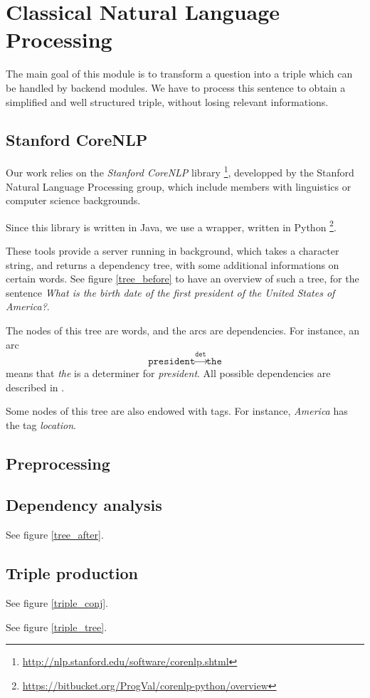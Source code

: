 \chapter{Classical Natural Language Processing}

The main goal of this module is to transform a question into a triple which can
be handled by backend modules. We have to process this sentence to obtain a simplified
and well structured triple, without losing relevant informations.

\section{Stanford CoreNLP}

Our work relies on the \emph{Stanford CoreNLP} library
\footnote{\url{http://nlp.stanford.edu/software/corenlp.shtml}}, developped by
the Stanford Natural Language Processing group, which include members with 
linguistics or computer science backgrounds. 

Since this library is written in Java, we use a wrapper, written in Python
\footnote{\url{https://bitbucket.org/ProgVal/corenlp-python/overview}}.

These tools provide a server running in background, which takes a character string,
and returns a dependency tree, with some additional informations on certain words.
See figure \ref{tree_before} to have an overview of such a tree, for the sentence
\emph{What is the birth date of the first president of the United States of America?}.

The nodes of this tree are words, and the arcs are dependencies. For instance,
an arc $$\texttt{president}\xrightarrow{\texttt{det}}\texttt{the}$$ means that
\emph{the} is a determiner for \emph{president}. All possible dependencies are 
described in \cite{stanfordDep}. 

Some nodes of this tree are also endowed with tags. For instance, \emph{America}
has the tag \emph{location}.


\section{Preprocessing}


\section{Dependency analysis}

See figure \ref{tree_after}.


\section{Triple production}

See figure \ref{triple_conj}.

See figure \ref{triple_tree}.

